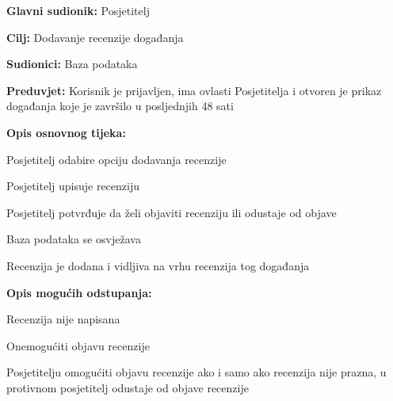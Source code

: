 
					\noindent {}
					\begin{packed_item}
						
						\item \textbf{Glavni sudionik: } Posjetitelj
						\item  \textbf{Cilj:} Dodavanje recenzije događanja
						\item  \textbf{Sudionici:} Baza podataka
						\item  \textbf{Preduvjet:} Korisnik je prijavljen, ima ovlasti Posjetitelja i otvoren je prikaz događanja koje je završilo u posljednjih 48 sati
						\item  \textbf{Opis osnovnog tijeka:}
						
						\item[] \begin{packed_enum}
							
							\item Posjetitelj odabire opciju dodavanja recenzije
							\item Posjetitelj upisuje recenziju
							\item Posjetitelj potvrđuje da želi objaviti recenziju ili odustaje od objave
							\item Baza podataka se osvježava
							\item Recenzija je dodana i vidljiva na vrhu recenzija tog događanja

						\end{packed_enum}
						
						\item  \textbf{Opis mogućih odstupanja:}
						
						\item[] \begin{packed_item}
							
							\item[2.a] Recenzija nije napisana 
							\item[] \begin{packed_enum}
								
								\item Onemogućiti objavu recenzije 
								\item Posjetitelju omogućiti objavu recenzije ako i samo ako recenzija nije prazna, u protivnom posjetitelj odustaje od objave recenzije
								
							\end{packed_enum}		
						\end{packed_item}
						
					\end{packed_item}
					
